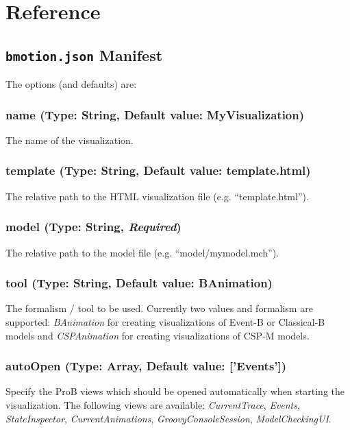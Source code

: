 \section{Reference}
\label{reference}

\subsection{\texttt{bmotion.json} Manifest}
\label{sec:manifest}

The options (and defaults) are:

\subsubsection{name (Type: String, Default value: MyVisualization)}

The name of the visualization.

\subsubsection{template (Type: String, Default value: template.html)}

The relative path to the HTML visualization file  (e.g. ``template.html'').

\subsubsection{model (Type: String, \textit{Required})}

The relative path to the model file (e.g. ``model/mymodel.mch'').

\subsubsection{tool (Type: String, Default value: BAnimation)}

The formalism / tool to be used. Currently two values and formalism are supported: \textit{BAnimation} for creating visualizations of Event-B or Classical-B models and \textit{CSPAnimation} for creating visualizations of CSP-M models.

\subsubsection{autoOpen (Type: Array, Default value: ['Events'])}

Specify the ProB views which should be opened automatically when starting the visualization. 
The following views are available: \textit{CurrentTrace}, \textit{Events}, \textit{StateInspector}, \textit{CurrentAnimations}, \textit{GroovyConsoleSession}, \textit{ModelCheckingUI}.